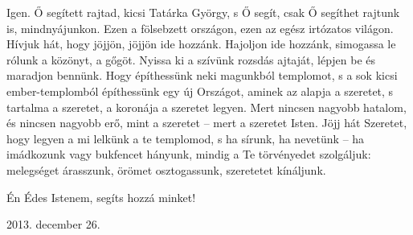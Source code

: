 \documentclass{IEEEtran}
\begin{document}
Igen. Ő segített rajtad, kicsi Tatárka György, s Ő segít, csak Ő segíthet
rajtunk is, mindnyájunkon. Ezen a fölsebzett országon, ezen az egész irtózatos
világon. Hívjuk hát, hogy jöjjön, jöjjön ide hozzánk. Hajoljon ide hozzánk,
simogassa le rólunk a közönyt, a gőgöt. Nyissa ki a szívünk rozsdás ajtaját,
lépjen be és maradjon bennünk. Hogy építhessünk neki magunkból templomot, s a
sok kicsi ember-templomból építhessünk egy új Országot, aminek az alapja a
szeretet, s tartalma a szeretet, a koronája a szeretet legyen. Mert nincsen
nagyobb hatalom, és nincsen nagyobb erő, mint a szeretet – mert a szeretet
Isten. Jöjj hát Szeretet, hogy legyen a mi lelkünk a te templomod, s ha
sírunk, ha nevetünk – ha imádkozunk vagy bukfencet hányunk, mindig a Te
törvényedet szolgáljuk: melegséget árasszunk, örömet osztogassunk, szeretetet
kínáljunk.

Én Édes Istenem, segíts hozzá minket!

2013. december 26.
\end{document}
